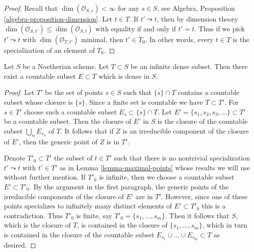 \begin{proof}
Recall that $\dim(\mathcal{O}_{S, s}) < \infty$ for any $s \in S$, see
Algebra, Proposition \ref{algebra-proposition-dimension}. Let $t \in T$.
If $t' \leadsto t$, then by dimension theory
$\dim(\mathcal{O}_{S, t'}) \leq \dim(\mathcal{O}_{S, t})$
with equality if and only if $t' = t$. Thus if we pick $t' \leadsto t$
with $\dim(\mathcal{O}_{T, t'})$ minimal, then $t' \in T_0$.
In other words, 
every $t \in T$ is the specialization of an element of $T_0$.
\end{proof}

\begin{lemma}
\label{lemma-countable-dense-subset}
Let $S$ be a Noetherian scheme. Let $T \subset S$ be an infinite dense subset.
Then there exist a countable subset $E \subset T$ which is dense in $S$.
\end{lemma}

\begin{proof}
Let $T'$ be the set of points $s \in S$ such that $\overline{\{s\}} \cap T$
contains a countable subset whose closure is $\overline{\{s\}}$.
Since a finite set is countable we have $T \subset T'$.
For $s \in T'$ choose such a countable subset
$E_s \subset \overline{\{s\}} \cap T$.
Let $E' = \{s_1, s_2, s_3, \ldots\} \subset T'$
be a countable subset. Then the closure of $E'$ in $S$ is the
closure of the countable subset $\bigcup_n E_{s_n}$ of $T$.
It follows that if $Z$
is an irreducible component of the closure of $E'$, then the generic
point of $Z$ is in $T'$.

\medskip\noindent
Denote $T'_0 \subset T'$ the subset of $t \in T'$ such that
there is no nontrivial specialization $t' \leadsto t$ with $t' \in T'$
as in Lemma \ref{lemma-maximal-points} whose results we will use
without further mention. If $T'_0$ is infinite, then we choose a
countable subset $E' \subset T'_0$. By the argument in the first
paragraph, the generic points of the irreducible components of the
closure of $E'$ are in $T'$. However, since one of these points specializes to
infinitely many distinct elements of $E' \subset T'_0$
this is a contradiction. Thus $T'_0$ is finite, say
$T'_0 = \{s_1, \ldots, s_m\}$. Then it follows that $S$, which is
the closure of $T$, is contained in the closure of
$\{s_1, \ldots, s_m\}$, which in turn is contained in the closure
of the countable subset $E_{s_1} \cup \ldots \cup E_{s_m} \subset T$
as desired.
\end{proof}








